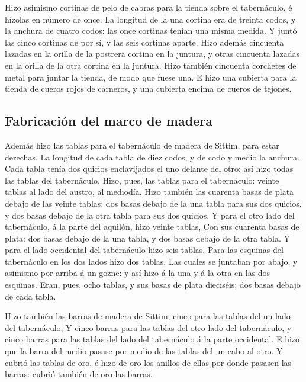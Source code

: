  Hizo asimismo cortinas de pelo de cabras para la tienda
sobre el tabernáculo, é hízolas en número de once.  La
longitud de la una cortina era de treinta codos, y la anchura de cuatro
codos: las once cortinas tenían una misma medida.  Y juntó
las cinco cortinas de por sí, y las seis cortinas aparte. 
Hizo además cincuenta lazadas en la orilla de la postrera cortina en la
juntura, y otras cincuenta lazadas en la orilla de la otra cortina en la
juntura.  Hizo también cincuenta corchetes de metal para
juntar la tienda, de modo que fuese una.  E hizo una
cubierta para la tienda de cueros rojos de carneros, y una cubierta
encima de cueros de tejones.

\hypertarget{fabricaciuxf3n-del-marco-de-madera}{%
\subsection{Fabricación del marco de
madera}\label{fabricaciuxf3n-del-marco-de-madera}}

 Además hizo las tablas para el tabernáculo de madera de
Sittim, para estar derechas.  La longitud de cada tabla de
diez codos, y de codo y medio la anchura.  Cada tabla tenía
dos quicios enclavijados el uno delante del otro: así hizo todas las
tablas del tabernáculo.  Hizo, pues, las tablas para el
tabernáculo: veinte tablas al lado del austro, al mediodía.
 Hizo también las cuarenta basas de plata debajo de las
veinte tablas: dos basas debajo de la una tabla para sus dos quicios, y
dos basas debajo de la otra tabla para sus dos quicios.  Y
para el otro lado del tabernáculo, á la parte del aquilón, hizo veinte
tablas,  Con sus cuarenta basas de plata: dos basas debajo
de la una tabla, y dos basas debajo de la otra tabla.  Y
para el lado occidental del tabernáculo hizo seis tablas. 
Para las esquinas del tabernáculo en los dos lados hizo dos tablas,
 Las cuales se juntaban por abajo, y asimismo por arriba á
un gozne: y así hizo á la una y á la otra en las dos esquinas.
 Eran, pues, ocho tablas, y sus basas de plata dieciséis;
dos basas debajo de cada tabla.

 Hizo también las barras de madera de Sittim; cinco para
las tablas del un lado del tabernáculo,  Y cinco barras
para las tablas del otro lado del tabernáculo, y cinco barras para las
tablas del lado del tabernáculo á la parte occidental.  E
hizo que la barra del medio pasase por medio de las tablas del un cabo
al otro.  Y cubrió las tablas de oro, é hizo de oro los
anillos de ellas por donde pasasen las barras: cubrió también de oro las
barras.

